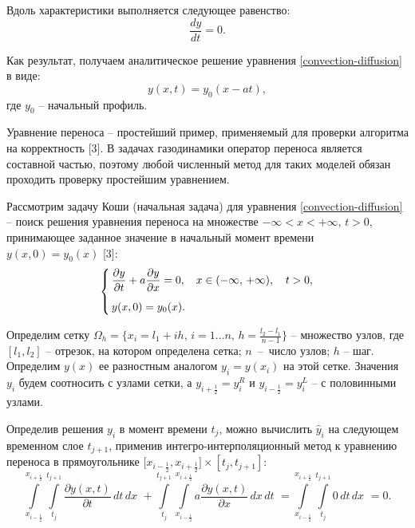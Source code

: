 \documentclass[12pt,a4paper]{article}
\newcommand{\half}{\frac{1}{2}}
\newcommand*{\Scale}[2][4]{\scalebox{#1}{$#2$}}
\begin{document}
    Вдоль характеристики выполняется следующее равенство:
    \[
        \dfrac{dy}{dt} = 0.  
    \]

    Как результат, получаем аналитическое решение уравнения \eqref{convection-diffusion} в виде: 
    \begin{equation}
        \label{exactSol}
        y(x, t) = y_0(x-at), 
    \end{equation}
    \noindent где $ y_0 $ -- начальный профиль.

    Уравнение переноса – простейший пример, применяемый для проверки алгоритма на корректность [3]. В задачах газодинамики оператор переноса является составной частью, поэтому любой численный метод для таких моделей обязан проходить проверку простейшим уравнением.

    Рассмотрим задачу Коши (начальная задача) для уравнения \eqref{convection-diffusion} -- поиск решения уравнения переноса на множестве $-\infty < x < +\infty,\, t > 0$, принимающее заданное значение в начальный момент времени $y(x,0) = y_0(x)$ [3]:
    \begin{equation}
        \label{Cauchy}
        \Scale[0.98] {
            \begin{cases}
                \,\dfrac{\partial y}{\partial t} + a \dfrac{\partial y}{\partial x} = 0, & x \in (-\infty,\, +\infty),\quad t > 0,
                \\[1em]
                \,y(x, 0) = y_0(x).
                \\
            \end{cases}
        }
    \end{equation}

    Определим сетку $\Omega_h = \{ x_i = l_1 + i h,\, i = 1 \ldots n,\, h = \frac{l_2-l_1}{n-1} \} $ -- множество узлов, где $[l_1, l_2]$ -- отрезок, на котором определена сетка; $n$~--~число узлов; $h$ -- шаг. Определим $y(x)$ ее разностным аналогом $y_i=y(x_i)$ на этой сетке. Значения $y_i$ будем соотносить с узлами сетки, а $ y_{ i + \half} = y_i^R $ и $ y_{i - \half} = y_i^L $ -- с половинными узлами.

    Определив решения $y_i$ в момент времени $ t_j $, можно вычислить $ \hat y_i $ на следующем временном слое $ t_{j+1} $, применив интегро-интерполяционный метод к уравнению переноса в прямоугольнике $ \bigl[ x_{i-\half}, x_{i+\half} \bigr] \times [t_j, t_{j+1}] $: 
    \[
        \int \limits_{x_{i-\half}}^{x_{i+\half}} \int \limits_{t_j}^{t_{j+1}} \dfrac{ \partial y(x, t) }{ \partial t } \, dt \, dx \,\, + \int \limits_{t_j}^{t_{j+1}} \int \limits_{x_{i-\half}}^{x_{i+\half}} a \dfrac{ \partial y(x,t) }{ \partial x } \, dx \, dt \,\, = \int \limits_{x_{i-\half}}^{x_{i+\half}} \int \limits_{t_j}^{t_{j+1}} 0 \, dt \, dx \, \, = 0.
    \]
\end{document}
